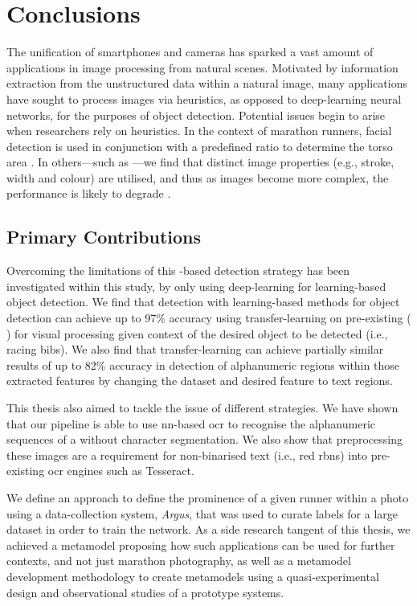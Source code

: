 \chapter{Conclusions}
\label{ch:conclusion}

The unification of smartphones and cameras has sparked a vast amount of applications in image processing from natural scenes. Motivated by information extraction from the unstructured data within a natural image, many applications have sought to process images via heuristics, as opposed to deep-learning neural networks, for the purposes of object detection. Potential issues begin to arise when researchers rely on heuristics. In the context of marathon runners,  facial detection is used in conjunction with a predefined ratio to determine the torso area \citep{Benami:2012jf}. In others---such as ---we find that distinct image properties (e.g., stroke, width and colour) are utilised, and thus as images become more complex, the performance is likely to degrade \citep{Li:2012wd}.

\section{Primary Contributions}

Overcoming the limitations of this -based detection strategy has been investigated within this study, by only using deep-learning  for learning-based object detection. We find that detection with learning-based methods for object detection can achieve up to 97\% accuracy using transfer-learning on pre-existing  (\frcnn{} \citep{Ren:2017ug}) for visual processing given context of the desired object to be detected (i.e., racing bibs). We also find that transfer-learning can achieve partially similar results of up to 82\% accuracy in detection of alphanumeric regions within those extracted features by changing the dataset and desired feature to text regions.

This thesis also aimed to tackle the issue of different  strategies. We have shown that our pipeline is able to use \gls{nn}-based \gls{ocr} to recognise the alphanumeric sequences of a  without character segmentation. We also show that preprocessing these images are a requirement for non-binarised text (i.e., red \glspl{rbn}) into pre-existing \gls{ocr} engines such as Tesseract.

We define an approach to define the prominence of a given runner within a photo using a data-collection system, \textit{Argus}, that was used to curate labels for a large dataset in order to train the network. As a side research tangent of this thesis, we achieved a metamodel proposing how such applications can be used for further contexts, and not just marathon photography, as well as a metamodel development methodology to create metamodels using a quasi-experimental design and observational studies of a prototype systems.


